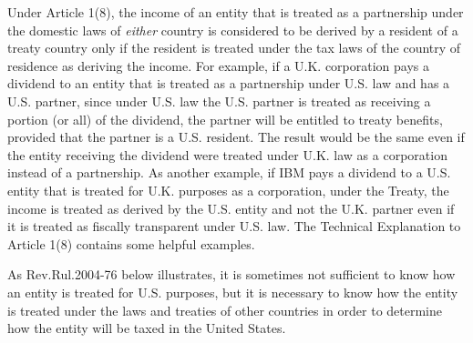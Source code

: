 Under Article 1(8), the income of an entity that is treated as a partnership under the domestic laws of \emph{either} country is considered to be derived by a resident of a treaty country only if the resident is treated under the tax laws of the country of residence as deriving the income.  For example, if a U.K. corporation pays a dividend to an entity that is treated as a partnership under U.S. law and has a U.S. partner, since under U.S. law the U.S. partner is treated as receiving a portion (or all) of the dividend, the partner will be entitled to treaty benefits, provided that the partner is a U.S. resident.  The result would be the same even if the entity receiving the dividend were treated under U.K. law as a corporation instead of a partnership.  As another example, if IBM pays a dividend to a U.S. entity that is treated for U.K. purposes as a corporation, under the Treaty, the income is treated as derived by the U.S. entity and not the U.K. partner even if it is treated as fiscally transparent under U.S. law.  The Technical Explanation to Article 1(8) contains some helpful examples. 

As Rev.\@ Rul.\@ 2004-76 below illustrates, it is sometimes not sufficient to know how an entity is treated for U.S. purposes, but it is necessary to know how the entity is treated under the laws and treaties of other countries in order to determine how the entity will be taxed in the United States.

